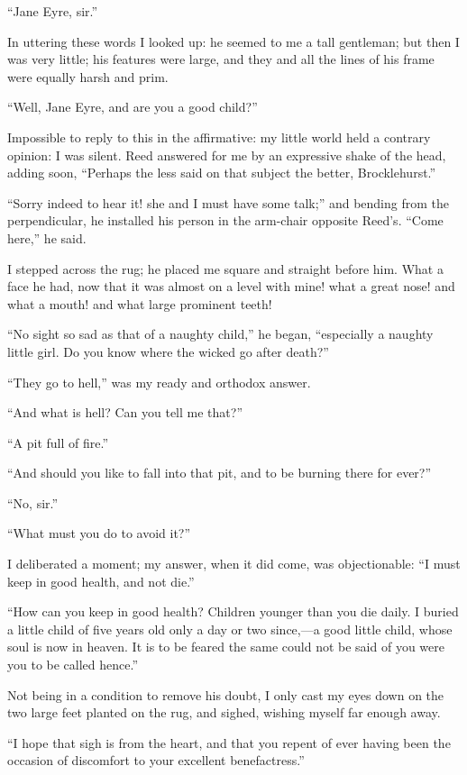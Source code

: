 \enquote{Jane Eyre, sir.}

In uttering these words I looked up: he seemed to me a tall gentleman;
but then I was very little; his features were large, and they and all
the lines of his frame were equally harsh and prim.

\enquote{Well, Jane Eyre, and are you a good child?}

Impossible to reply to this in the affirmative: my little world held a
contrary opinion: I was silent. \Mrs{} Reed answered for me by an
expressive shake of the head, adding soon, \enquote{Perhaps the less
said on that subject the better, \Mr{} Brocklehurst.}

\enquote{Sorry indeed to hear it! she and I must have some talk;} and
bending from the perpendicular, he installed his person in the arm-chair
opposite \Mrs{} Reed's. \enquote{Come here,} he said.

I stepped across the rug; he placed me square and straight before him. 
What a face he had, now that it was almost on a level with mine! what a
great nose! and what a mouth! and what large prominent teeth!

\enquote{No sight so sad as that of a naughty child,} he began,
\enquote{especially a naughty little girl. Do you know where the wicked
go after death?}

\enquote{They go to hell,} was my ready and orthodox answer.

\enquote{And what is hell? Can you tell me that?}

\enquote{A pit full of fire.}

\enquote{And should you like to fall into that pit, and to be burning
there for ever?}

\enquote{No, sir.}

\enquote{What must you do to avoid it?}

I deliberated a moment; my answer, when it did come, was objectionable:
\enquote{I must keep in good health, and not die.}

\enquote{How can you keep in good health? Children younger than you die
daily. I buried a little child of five years old only a day or two
since,---a good little child, whose soul is now in heaven. It is to be
feared the same could not be said of you were you to be called hence.}

Not being in a condition to remove his doubt, I only cast my eyes down
on the two large feet planted on the rug, and sighed, wishing myself far
enough away.

\enquote{I hope that sigh is from the heart, and that you repent of ever
having been the occasion of discomfort to your excellent benefactress.}

